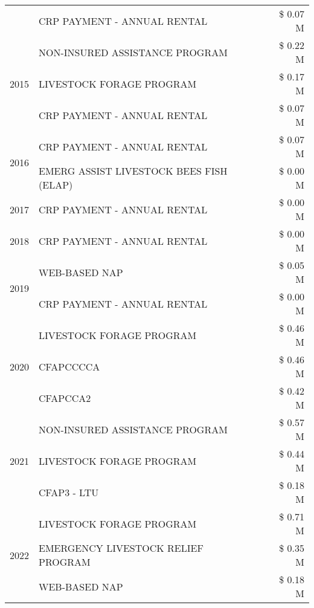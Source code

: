 \begin{tabular}{llr}
 & CRP PAYMENT - ANNUAL RENTAL & \$ 0.07 M \\
\cline{1-3}
\multirow[t]{3}{*}{2015} & NON-INSURED ASSISTANCE PROGRAM & \$ 0.22 M \\
 & LIVESTOCK FORAGE PROGRAM & \$ 0.17 M \\
 & CRP PAYMENT - ANNUAL RENTAL & \$ 0.07 M \\
\cline{1-3}
\multirow[t]{2}{*}{2016} & CRP PAYMENT - ANNUAL RENTAL & \$ 0.07 M \\
 & EMERG ASSIST LIVESTOCK BEES FISH (ELAP) & \$ 0.00 M \\
\cline{1-3}
2017 & CRP PAYMENT - ANNUAL RENTAL & \$ 0.00 M \\
\cline{1-3}
2018 & CRP PAYMENT - ANNUAL RENTAL & \$ 0.00 M \\
\cline{1-3}
\multirow[t]{2}{*}{2019} & WEB-BASED NAP & \$ 0.05 M \\
 & CRP PAYMENT - ANNUAL RENTAL & \$ 0.00 M \\
\cline{1-3}
\multirow[t]{3}{*}{2020} & LIVESTOCK FORAGE PROGRAM & \$ 0.46 M \\
 & CFAPCCCCA & \$ 0.46 M \\
 & CFAPCCA2 & \$ 0.42 M \\
\cline{1-3}
\multirow[t]{3}{*}{2021} & NON-INSURED ASSISTANCE PROGRAM & \$ 0.57 M \\
 & LIVESTOCK FORAGE PROGRAM & \$ 0.44 M \\
 & CFAP3 - LTU & \$ 0.18 M \\
\cline{1-3}
\multirow[t]{3}{*}{2022} & LIVESTOCK FORAGE PROGRAM & \$ 0.71 M \\
 & EMERGENCY LIVESTOCK RELIEF PROGRAM & \$ 0.35 M \\
 & WEB-BASED NAP & \$ 0.18 M \\
\cline{1-3}
\bottomrule
\end{tabular}
